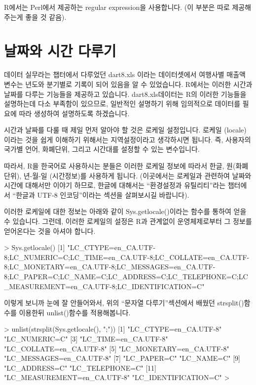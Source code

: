 \documentclass[tutorial.tex]{subfiles}
\begin{document}
R에서는 Perl에서 제공하는 regular expression을 사용합니다. 
(이 부분은 따로 제공해주는게 좋을 것 같음).
     


\section{날짜와 시간 다루기}

데이터 실무라는 챕터에서 다루었던 dart8.xls 이라는 데이터셋에서 여행사별 매출액 변수는 년도와 분기별로 기록이 되어 있음을 알 수 있었습니다. 
R에서는 이러한 시간과 날짜를 다루는 기능들을 제공하고 있습니다.
dart8.xls데이터는 R의 이러한 기능들을 설명하는데 다소 부족함이 있으므로, 일반적인 설명하기 위해 임의적으로 데이터를 필요에 따라 생성하여 설명하도록 하겠습니다. 

시간과 날짜를 다룰 때 제일 먼저 알아야 할 것은 로케일 설정입니다. 
로케일 (locale)이라는 것을 쉽게 이해하기 위해서는 지역설정이라고 생각하시면 됩니다. 
즉, 사용자의 국가별 언어, 화폐단위, 그리고 시간대를 설정할 수 있는 변수입니다. 

따라서, R을 한국어로 사용하시는 분들은 이러한 로케일 정보에 따라서 한글, 원(화폐단위), 년-월-일 (시간정보)를 사용하게 됩니다. 
(이곳에서는 로케일과 관련하여 날짜와 시간에 대해서만 이야기 하므로, 한글에 대해서는 ``환경설정과 유틸리티''라는 챕터에서 ``한글과 UTF-8 인코딩''이라는 섹션을 살펴보시길 바랍니다).


이러한 로케일에 대한 정보는 아래와 같이 Sys.getlocale()이라는 함수를 통하여 얻을 수 있습니다. 
그런데, 이러한 로케일의 설정은 R과 관계없이 운영체제로부터 그 정보를 얻어온다는 것을 아셔야 합니다. 

\begin{Schunk}
\begin{Soutput} 
> Sys.getlocale()
[1] "LC_CTYPE=en_CA.UTF-8;LC_NUMERIC=C;LC_TIME=en_CA.UTF-8;LC_COLLATE=en_CA.UTF-8;LC_MONETARY=en_CA.UTF-8;LC_MESSAGES=en_CA.UTF-8;LC_PAPER=C;LC_NAME=C;LC_ADDRESS=C;LC_TELEPHONE=C;LC_MEASUREMENT=en_CA.UTF-8;LC_IDENTIFICATION=C"
\end{Soutput}
\end{Schunk}

이렇게 보니까 눈에 잘 안들어와서, 위의 ``문자열 다루기''섹션에서 배웠던 strsplit()함수를 이용한뒤 unlist()함수를 적용해봅니다.

\begin{Schunk}
\begin{Soutput} 
> unlist(strsplit(Sys.getlocale(), ";"))
 [1] "LC_CTYPE=en_CA.UTF-8"       "LC_NUMERIC=C"              
 [3] "LC_TIME=en_CA.UTF-8"        "LC_COLLATE=en_CA.UTF-8"    
 [5] "LC_MONETARY=en_CA.UTF-8"    "LC_MESSAGES=en_CA.UTF-8"   
 [7] "LC_PAPER=C"                 "LC_NAME=C"                 
 [9] "LC_ADDRESS=C"               "LC_TELEPHONE=C"            
[11] "LC_MEASUREMENT=en_CA.UTF-8" "LC_IDENTIFICATION=C"       
> 
\end{Soutput}
\end{Schunk}
\end{document}
